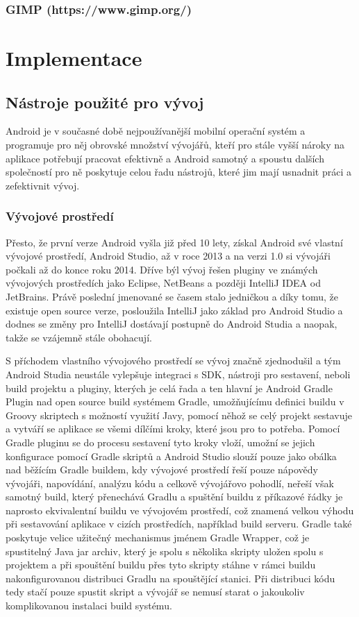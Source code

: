 \documentclass{article}
\begin{document}
\subsubsection{GIMP (https://www.gimp.org/)}


\section{Implementace}

\subsection{Nástroje použité pro vývoj}
Android je v současné době nejpoužívanější mobilní operační systém a programuje pro něj obrovské
množství vývojářů, kteří pro stále vyšší nároky na aplikace potřebují pracovat efektivně a Android samotný
a spoustu dalších společností pro ně poskytuje celou řadu nástrojů, které jim mají usnadnit práci a zefektivnit vývoj.

\subsubsection{Vývojové prostředí}
Přesto, že první verze Android vyšla již před 10 lety, získal Android své vlastní vývojové prostředí, Android Studio,
až v roce 2013 a na verzi 1.0 si vývojáři počkali až do konce roku 2014. Dříve býl vývoj řešen pluginy ve známých
vývojových prostředích jako Eclipse, NetBeans a později IntelliJ IDEA od JetBrains. Právě poslední jmenované
se časem stalo jedničkou a díky tomu, že existuje open source verze, posloužila IntelliJ jako základ pro Android Studio
a dodnes se změny pro IntelliJ dostávají postupně do Android Studia a naopak, takže se vzájemně stále obohacují.

S příchodem vlastního vývojového prostředí se vývoj značně zjednodušil a tým Android Studia neustále vylepšuje integraci s SDK,
nástroji pro sestavení, neboli build projektu a pluginy, kterých je celá řada a ten hlavní je Android Gradle Plugin
nad open source build systémem Gradle, umožňujícímu definici buildu v Groovy skriptech s možností využití Javy,
 pomocí něhož se celý projekt sestavuje a vytváří se aplikace se všemi dílčími kroky, které jsou pro to potřeba.
Pomocí Gradle pluginu se do procesu sestavení tyto kroky vloží, umožní se jejich konfigurace pomocí Gradle skriptů
a Android Studio slouží pouze jako obálka nad běžícím Gradle buildem, kdy vývojové prostředí řeší pouze nápovědy vývojáři,
napovídání, analýzu kódu a celkově vývojářovo pohodlí, neřeší však samotný build, který přenechává Gradlu a spuštění buildu
 z příkazové řádky je naprosto ekvivalentní buildu ve vývojovém prostředí, což znamená velkou výhodu při sestavování aplikace
 v cizích prostředích, například build serveru.
 Gradle také poskytuje velice užitečný mechanismus jménem Gradle Wrapper, což je spustitelný Java jar archiv,
 který je spolu s několika skripty uložen spolu s projektem a při spouštění buildu přes tyto skripty stáhne v rámci
 buildu nakonfigurovanou distribuci Gradlu na spouštějící stanici. Při distribuci kódu tedy stačí pouze spustit
 skript a vývojář se nemusí starat o jakoukoliv komplikovanou instalaci build systému.
\end{document}

